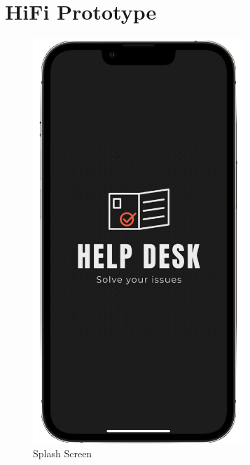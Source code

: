 \documentclass[acmtog]{acmart}
\begin{document}
\section{HiFi Prototype}
\begin{figure}[H]
    \includegraphics[width=8cm]{Prototype/MockUps/Mockup1.png}
    \caption{Splash Screen}
\end{figure}
\end{document}
